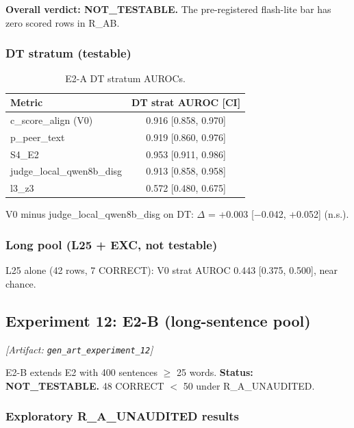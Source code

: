 \documentclass[11pt,letterpaper]{article}
\begin{document}
\textbf{Overall verdict: NOT\_TESTABLE.} The pre-registered flash-lite bar has zero scored rows in R\_AB.

\subsubsection{DT stratum (testable)}

\begin{table}[!htbp]
\centering
\caption{E2-A DT stratum AUROCs.}
\label{tab:e2a_dt}
\begin{tabular}{lc}
\toprule
Metric & DT strat AUROC [CI] \\
\midrule
c\_score\_align (V0) & 0.916 [0.858, 0.970] \\
p\_peer\_text & 0.919 [0.860, 0.976] \\
S4\_E2 & 0.953 [0.911, 0.986] \\
judge\_local\_qwen8b\_disg & 0.913 [0.858, 0.958] \\
l3\_z3 & 0.572 [0.480, 0.675] \\
\bottomrule
\end{tabular}
\end{table}

V0 minus judge\_local\_qwen8b\_disg on DT: $\Delta$ = +0.003 [$-$0.042, +0.052] (n.s.).

\subsubsection{Long pool (L25 + EXC, not testable)}

L25 alone (42 rows, 7 CORRECT): V0 strat AUROC 0.443 [0.375, 0.500], near chance.

\subsection{Experiment 12: E2-B (long-sentence pool)}
\label{sec:exp12}
\noindent\textit{[Artifact: \texttt{gen\_art\_experiment\_12}]}

E2-B extends E2 with 400 sentences $\geq$ 25 words. \textbf{Status: NOT\_TESTABLE.} 48 CORRECT $<$ 50 under R\_A\_UNAUDITED.

\subsubsection{Exploratory R\_A\_UNAUDITED results}
\end{document}
